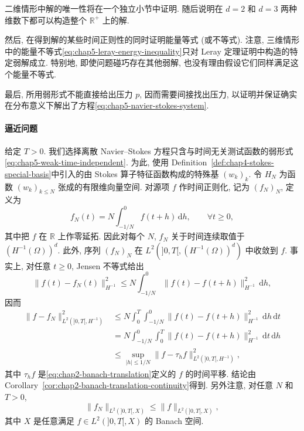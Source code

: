 二维情形中解的唯一性将在一个独立小节中证明. 随后说明在 $d=2$ 和 $d=3$ 两种维数下都可以构造整个 $\mathbb R^+$ 上的解.

然后, 在得到解的某些时间正则性的同时证明能量等式 (或不等式). 注意, 三维情形中的能量不等式\eqref{eq:chap5-leray-energy-inequality}只对 Leray 定理证明中构造的特定弱解成立. 特别地, 即使问题碰巧存在其他弱解, 也没有理由假设它们同样满足这个能量不等式.

最后, 所用弱形式不能直接给出压力 $p$, 因而需要间接找出压力, 以证明并保证确实在分布意义下解出了方程\eqref{eq:chap5-navier-stokes-system}.

\paragraph{逼近问题}

给定 $T>0$. 我们选择离散 Navier--Stokes 方程只含与时间无关测试函数的弱形式\eqref{eq:chap5-weak-time-independent}. 为此, 使用 Definition~\ref{def:chap4-stokes-special-basis}中引入的由 Stokes 算子特征函数构成的特殊基 $(w_k)_k$. 令 $H_N$ 为函数 $(w_k)_{k\leq N}$ 张成的有限维向量空间. 对源项 $f$ 作时间正则化, 记为 $(f_N)_N$, 定义为
\begin{equation}
 f_N(t)=N\int_{-1/N}^0f(t+h)\,\mathrm dh,
 \qquad\forall t\geq0,
\label{eq:chap5-source-time-regularization}
\end{equation}
其中把 $f$ 在 $\mathbb R$ 上作零延拓. 因此对每个 $N$, $f_N$ 关于时间连续取值于 $(H^{-1}(\Omega))^d$. 此外, 序列 $(f_N)_N$ 在 $L^2(]0,T[,(H^{-1}(\Omega))^d)$ 中收敛到 $f$. 事实上, 对任意 $t\geq0$, Jensen 不等式给出
\[
 \|f(t)-f_N(t)\|_{H^{-1}}^2
 \leq N\int_{-1/N}^0\|f(t)-f(t+h)\|_{H^{-1}}^2\,\mathrm dh,
\]
因而
\begin{align*}
 \|f-f_N\|_{L^2(]0,T[,H^{-1})}^2
 &\leq N\int_0^T\int_{-1/N}^0\|f(t)-f(t+h)\|_{H^{-1}}^2\,\mathrm dh\,\mathrm dt\\
 &=N\int_{-1/N}^0\int_0^T\|f(t)-f(t+h)\|_{H^{-1}}^2\,\mathrm dt\,\mathrm dh\\
 &\leq\sup_{|h|\leq1/N}\|f-\tau_hf\|_{L^2(]0,T[,H^{-1})}^2,
\end{align*}
其中 $\tau_hf$ 是\eqref{eq:chap2-banach-translation}定义的 $f$ 的时间平移. 结论由 Corollary~\ref{cor:chap2-banach-translation-continuity}得到. 另外注意, 对任意 $N$ 和 $T>0$,
\begin{equation}
 \|f_N\|_{L^2(]0,T[,X)}\leq\|f\|_{L^2(]0,T[,X)},
\label{eq:chap5-source-regularization-bound}
\end{equation}
其中 $X$ 是任意满足 $f\in L^2(]0,T[,X)$ 的 Banach 空间.

